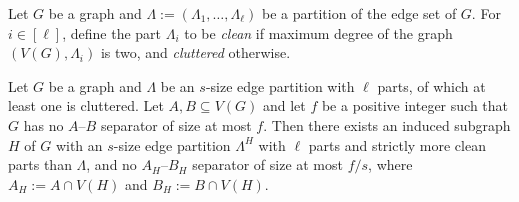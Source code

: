 Let $G$ be a graph and $\Lambda := (\Lambda_1,\dots,\Lambda_{\ell})$ be a partition of the edge set of $G$. For $i\in [\ell]$, define the part $\Lambda_i$ to be \emph{clean} if maximum degree of the graph $(V(G), \Lambda_i)$ is two, and \emph{cluttered} otherwise.

\begin{lemma}\label{lem:induced_menger_cleaning_step}
    Let $G$ be a graph and $\Lambda$ be an $s$-size edge partition with $\ell$ parts, of which at least one is cluttered. Let $A,B \subseteq V(G)$ and let $f$ be a positive integer such that $G$ has no $A$--$B$ separator of size at most $f$. Then there exists an induced subgraph $H$ of $G$ with an $s$-size edge partition $\Lambda^H$ with $\ell$ parts and strictly more clean parts than $\Lambda$, and no $A_H$--$B_H$ separator of size at most $f/s$, where $A_H := A \cap V(H)$ and $B_H := B \cap V(H)$.
\end{lemma}
